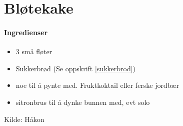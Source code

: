 \section{﻿Bløtekake}


\paragraph{Ingredienser}
\begin{itemize}[noitemsep]
	\item 3 små fløter
	\item Sukkerbrød (Se oppskrift \ref{sukkerbrod})
	\item noe til å pynte med. Fruktkoktail eller ferske jordbær
	\item sitronbrus til å dynke bunnen med, evt solo
\end{itemize}


Kilde: Håkon

